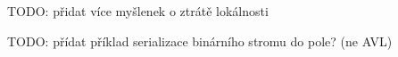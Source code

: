 TODO: přidat více myšlenek o ztrátě lokálnosti

TODO: přídat příklad serializace binárního stromu do pole? (ne AVL)




